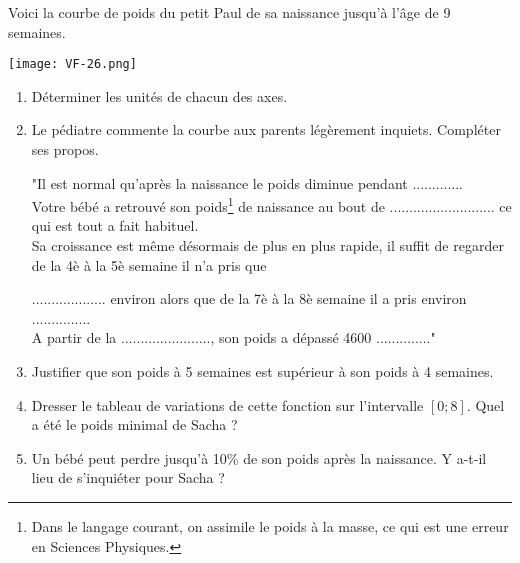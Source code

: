 
Voici la courbe de poids du petit Paul de sa naissance jusqu'à l'âge de 9 semaines.

\texttt{[image: VF-26.png]} 


\begin{enumerate}
\item Déterminer les unités de chacun des axes.
\item Le pédiatre commente la courbe aux parents légèrement inquiets. Compléter ses propos.

"Il est normal qu'après la naissance le poids diminue pendant .............\\

Votre bébé a retrouvé son poids\footnote{Dans le langage courant, on assimile le poids à la masse, ce qui est une erreur en Sciences Physiques.} de naissance au bout de ........................... ce qui est tout a fait habituel.\\

Sa croissance est même désormais de plus en plus rapide, il suffit de regarder de la 4è à la 5è semaine il n'a pris que

 ................... environ alors que de la 7è à la 8è semaine il a pris environ ...............\\

A partir de la ......................., son poids a dépassé 4600 .............."
\item Justifier que son poids à 5 semaines est supérieur à son poids à 4 semaines.
\item Dresser le tableau de variations de cette fonction sur l'intervalle $[0;8]$. Quel a été le poids minimal de Sacha ?
\item Un bébé peut perdre jusqu'à 10\% de son poids après la naissance. Y a-t-il lieu de s'inquiéter pour Sacha ?



\end{enumerate}
